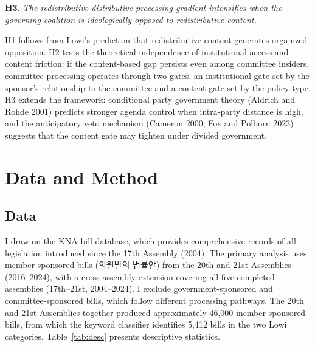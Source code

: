 \documentclass[11pt]{article}
\begin{document}
\medskip
\noindent\textbf{H3.} \textit{The redistributive-distributive processing gradient intensifies when the governing coalition is ideologically opposed to redistributive content.}

\medskip
\noindent H1 follows from Lowi's prediction that redistributive content generates organized opposition. H2 tests the theoretical independence of institutional access and content friction: if the content-based gap persists even among committee insiders, committee processing operates through two gates, an institutional gate set by the sponsor's relationship to the committee and a content gate set by the policy type. H3 extends the framework: conditional party government theory (Aldrich and Rohde 2001) predicts stronger agenda control when intra-party distance is high, and the anticipatory veto mechanism (Cameron 2000; Fox and Polborn 2023) suggests that the content gate may tighten under divided government.


\section{Data and Method}
\label{sec:method}

\subsection{Data}
\label{sec:data}

I draw on the KNA bill database, which provides comprehensive records of all legislation introduced since the 17th Assembly (2004). The primary analysis uses member-sponsored bills (의원발의 법률안) from the 20th and 21st Assemblies (2016--2024), with a cross-assembly extension covering all five completed assemblies (17th--21st, 2004--2024). I exclude government-sponsored and committee-sponsored bills, which follow different processing pathways. The 20th and 21st Assemblies together produced approximately 46,000 member-sponsored bills, from which the keyword classifier identifies 5,412 bills in the two Lowi categories. Table~\ref{tab:desc} presents descriptive statistics.
\end{document}
